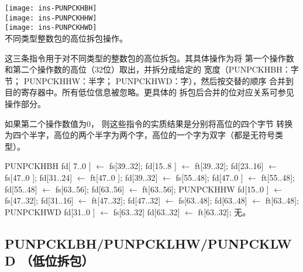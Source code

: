 \begin{instructionblk}
  \texttt{[image: ins-PUNPCKHBH]} \\
  \texttt{[image: ins-PUNPCKHHW]} \\
  \texttt{[image: ins-PUNPCKHWD]} \\
  {不同类型整数包的高位拆包操作。}
  {这三条指令用于对不同类型的整数包的高位拆包。其具体操作为将
  第一个操作数和第二个操作数的高位（32位）取出，并拆分成给定的
  宽度（PUNPCKHBH：字节； PUNPCKHHW：半字； PUNPCKHWD：字），然后按交替的顺序
  合并到目的寄存器中。所有低位信息被忽略。更具体的
  拆包后合并的位对应关系可参见操作部分。
  
  如果第二个操作数值为0， 则这些指令的实质结果是分别将高位的四个字节
  转换为四个半字，高位的两个半字为两个字，高位的一个字为双字（都是无符号类型）。}
  {PUNPCKHBH \narrownewline
  fd[ 7..0 ] $\leftarrow$ fs[39..32]; \narrownewline
  fd[15..8 ] $\leftarrow$ ft[39..32]; \narrownewline
  fd[23..16] $\leftarrow$ fs[47..0 ]; \narrownewline
  fd[31..24] $\leftarrow$ ft[47..0 ]; \narrownewline
  fd[39..32] $\leftarrow$ fs[55..48]; \narrownewline
  fd[47..0 ] $\leftarrow$ ft[55..48]; \narrownewline
  fd[55..48] $\leftarrow$ fs[63..56]; \narrownewline
  fd[63..56] $\leftarrow$ ft[63..56]; \narrownewline \narrownewline
  PUNPCKHHW \narrownewline
  fd[15..0 ] $\leftarrow$ fs[47..32]; \narrownewline
  fd[31..16] $\leftarrow$ ft[47..32]; \narrownewline
  fd[47..32] $\leftarrow$ fs[63..48]; \narrownewline
  fd[63..48] $\leftarrow$ ft[63..48]; \narrownewline \narrownewline
  PUNPCKHWD \narrownewline
  fd[31..0 ] $\leftarrow$ fs[63..32] \narrownewline
  fd[63..32] $\leftarrow$ ft[63..32];}
  {无。}
\end{instructionblk}

\subsection{PUNPCKLBH/PUNPCKLHW/PUNPCKLWD （低位拆包）}

